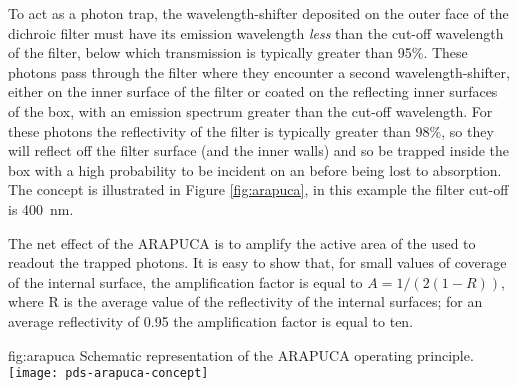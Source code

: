 To act as a photon trap, the wavelength-shifter deposited on the outer face of the dichroic filter must have its emission wavelength \textit{less} than the cut-off wavelength of the filter, below which transmission is typically greater than 95\%. These photons pass through the filter where they encounter a second wavelength-shifter, either on the inner surface of the filter or coated on the reflecting inner surfaces of the box,
with an emission spectrum greater than the cut-off wavelength. For these photons the reflectivity of the filter is typically greater than 98\%, so they will reflect off the filter surface (and the inner walls) and so be trapped inside the box with a high probability to be incident on an  before being lost to absorption. The concept is illustrated in Figure \ref{fig:arapuca}, in this example the filter cut-off is \SI{400}{nm}.


The net effect of the ARAPUCA is to amplify the active area of the  used to readout the trapped photons. It is easy to show that, for small values of  coverage of the internal surface, the amplification factor is equal to $A=1/(2(1-R))$,
where R is the average value of the reflectivity of the internal surfaces; for an average reflectivity of 0.95 the amplification factor is equal to ten.

\begin{dunefigure}{fig:arapuca}
{Schematic representation of the ARAPUCA operating principle.}
  \texttt{[image: pds-arapuca-concept]}   
\end{dunefigure}


